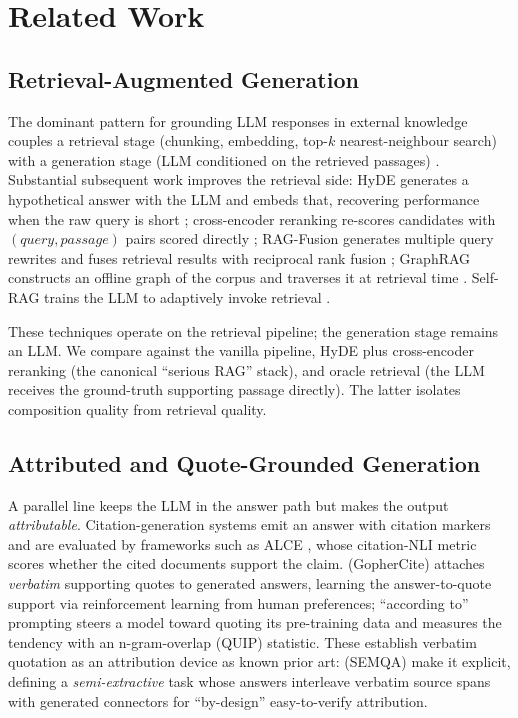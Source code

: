 \section{Related Work}
\label{sec:related}

\subsection{Retrieval-Augmented Generation}

The dominant pattern for grounding LLM responses in external
knowledge couples a retrieval stage (chunking, embedding, top-$k$
nearest-neighbour search) with a generation stage (LLM
conditioned on the retrieved passages) \citep{lewis2020rag,
karpukhin2020dpr}. Substantial subsequent work improves the
retrieval side: HyDE generates a hypothetical answer with the LLM
and embeds that, recovering performance when the raw query is
short \citep{gao2022hyde}; cross-encoder reranking re-scores
candidates with $(query, passage)$ pairs scored directly
\citep{nogueira2019passage, reimers2019sentencebert};
RAG-Fusion generates multiple query rewrites and fuses retrieval
results with reciprocal rank fusion \citep{rackauckas2024ragfusion};
GraphRAG constructs an offline graph of the corpus and traverses
it at retrieval time \citep{edge2024graphrag}. Self-RAG trains
the LLM to adaptively invoke retrieval \citep{asai2024selfrag}.

These techniques operate on the retrieval pipeline; the generation
stage remains an LLM. We compare \hyphae{} against the vanilla
pipeline, HyDE plus cross-encoder reranking (the canonical
``serious RAG'' stack), and oracle retrieval (the LLM receives the
ground-truth supporting passage directly). The latter isolates
composition quality from retrieval quality.

\subsection{Attributed and Quote-Grounded Generation}
\label{sec:related-attribution}

A parallel line keeps the LLM in the answer path but makes the
output \emph{attributable}. Citation-generation systems emit an
answer with citation markers and are evaluated by frameworks such as
ALCE \citep{gao2023alce}, whose citation-NLI metric scores whether
the cited documents support the claim. \citet{menick2022gophercite}
(GopherCite) attaches \emph{verbatim} supporting quotes to generated
answers, learning the answer-to-quote support via reinforcement
learning from human preferences; ``according to'' prompting
\citep{weller2023accordingto} steers a model toward quoting its
pre-training data and measures the tendency with an n-gram-overlap
(QUIP) statistic. These establish verbatim quotation as an
attribution device as known prior art: \citet{schuster2023semqa}
(SEMQA) make it explicit, defining a \emph{semi-extractive} task
whose answers interleave verbatim source spans with generated
connectors for ``by-design'' easy-to-verify attribution.

